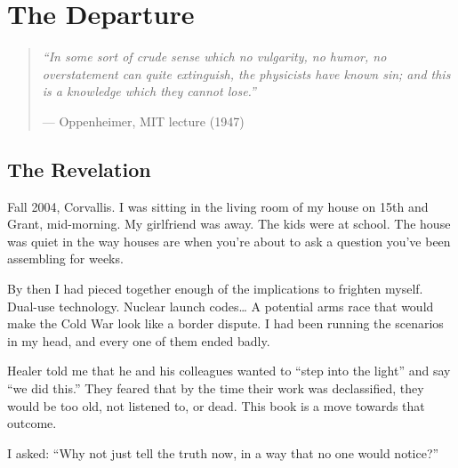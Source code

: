 
\chapter{The Departure}
\label{pos07:the-departure}

\begin{quote}\small\textit{%
``In some sort of crude sense which no vulgarity, no humor, no overstatement can quite extinguish, the physicists have known sin; and this is a knowledge which they cannot lose.''%
}\par\raggedleft --- Oppenheimer, MIT lecture (1947)\end{quote}

\vspace{0.5cm}



\section*{The Revelation}
\label{pos07:the-revelation}


Fall 2004, Corvallis. I was sitting in the living room of my house on 15th and Grant, mid-morning. My girlfriend was away. The kids were at school. The house was quiet in the way houses are when you're about to ask a question you've been assembling for weeks.

By then I had pieced together enough of the implications to frighten myself. Dual-use technology. Nuclear launch codes\ldots{} A potential arms race that would make the Cold War look like a border dispute. I had been running the scenarios in my head, and every one of them ended badly.

Healer told me that he and his colleagues wanted to ``step into the light'' and say ``we did this.'' They feared that by the time their work was declassified, they would be too old, not listened to, or dead. This book is a move towards that outcome.

I asked: ``Why not just tell the truth now, in a way that no one would notice?''

